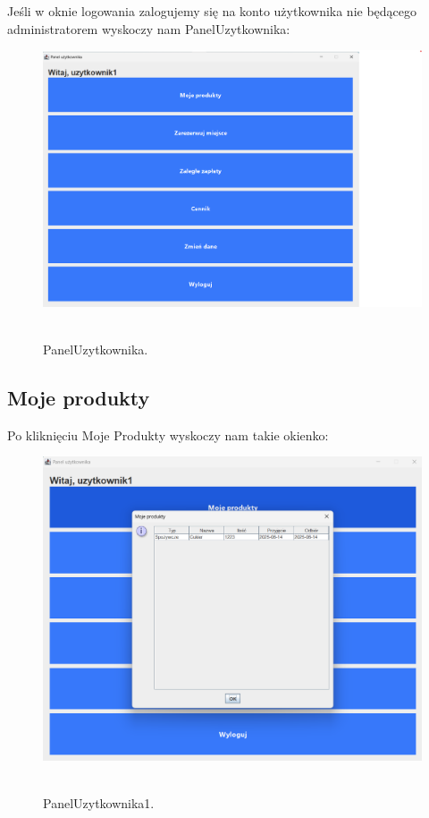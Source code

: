 Jeśli w oknie logowania zalogujemy się na konto użytkownika nie będącego administratorem wyskoczy nam PanelUzytkownika:

\begin{figure}[H]
    \centering
    \includegraphics[width=.9\linewidth]{figures/PanelUzytkownika.png}\
    \caption{PanelUzytkownika.\label{PanelUzytkownika}}
\end{figure}

\subsection{Moje produkty}
\label{subsec:Moje produkty}

Po kliknięciu Moje Produkty wyskoczy nam takie okienko:

\begin{figure}[H]
    \centering
    \includegraphics[width=.9\linewidth]{figures/PanelUzytkownika1.png}\
    \caption{PanelUzytkownika1.\label{PanelUzytkownika1}}
\end{figure}

